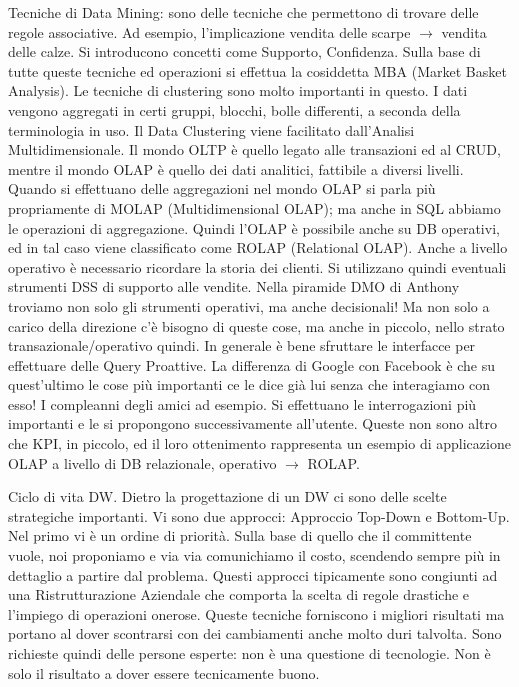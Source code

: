 Tecniche di Data Mining: sono delle tecniche che permettono di trovare delle regole associative. Ad esempio, l'implicazione vendita delle scarpe $\rightarrow$ vendita delle calze. Si introducono concetti come Supporto, Confidenza. Sulla base di tutte queste tecniche ed operazioni si effettua la cosiddetta MBA (Market Basket Analysis). Le tecniche di clustering sono molto importanti in questo. I dati vengono aggregati in certi gruppi, blocchi, bolle differenti, a seconda della terminologia in uso. Il Data Clustering viene facilitato dall'Analisi Multidimensionale. Il mondo OLTP è quello legato alle transazioni ed al CRUD, mentre il mondo OLAP è quello dei dati analitici, fattibile a diversi livelli. Quando si effettuano delle aggregazioni nel mondo OLAP si parla più propriamente di MOLAP (Multidimensional OLAP); ma anche in SQL abbiamo le operazioni di aggregazione. Quindi l'OLAP è possibile anche su DB operativi, ed in tal caso viene classificato come ROLAP (Relational OLAP). Anche a livello operativo è necessario ricordare la storia dei clienti. Si utilizzano quindi eventuali strumenti DSS di supporto alle vendite. Nella piramide DMO di Anthony troviamo non solo gli strumenti operativi, ma anche decisionali! Ma non solo a carico della direzione c'è bisogno di queste cose, ma anche in piccolo, nello strato transazionale/operativo quindi.  In generale è bene sfruttare le interfacce per effettuare delle Query Proattive. La differenza di Google con Facebook è che su quest'ultimo le cose più importanti ce le dice già lui senza che interagiamo con esso! I compleanni degli amici ad esempio. Si effettuano le interrogazioni più importanti e le si propongono successivamente all'utente. Queste non sono altro che KPI, in piccolo, ed il loro ottenimento rappresenta un esempio di applicazione OLAP a livello di DB relazionale, operativo $\rightarrow$ ROLAP.  

Ciclo di vita DW. Dietro la progettazione di un DW ci sono delle scelte strategiche importanti. Vi sono due approcci: Approccio Top-Down e Bottom-Up. Nel primo vi è un ordine di priorità. Sulla base di quello che il committente vuole, noi proponiamo e via via comunichiamo il costo, scendendo sempre più in dettaglio a partire dal problema. Questi approcci tipicamente sono congiunti ad una Ristrutturazione Aziendale che comporta la scelta di regole drastiche e l'impiego di operazioni onerose. Queste tecniche forniscono i migliori risultati ma portano al dover scontrarsi con dei cambiamenti anche molto duri talvolta. Sono richieste quindi delle persone esperte: non è una questione di tecnologie. Non è solo il risultato a dover essere tecnicamente buono. 


